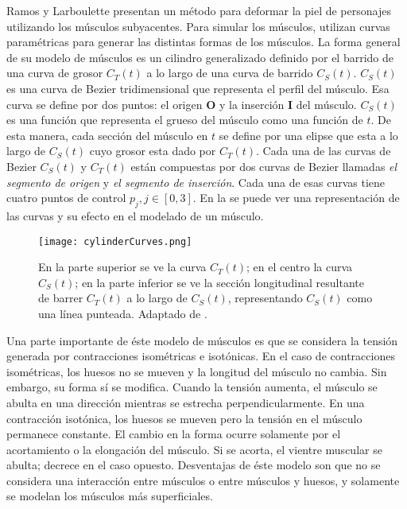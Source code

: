 Ramos y Larboulette \citep{ramos2013muscle} presentan un método para deformar la piel de personajes utilizando los músculos subyacentes. Para simular los músculos, utilizan curvas paramétricas para generar las distintas formas de los músculos. La forma general de su modelo de músculos es un cilindro generalizado definido por el barrido de una curva de grosor $C_T(t)$ a lo largo de una curva de barrido $C_S(t)$. $C_S(t)$ es una curva de Bezier tridimensional que representa el perfil del músculo. Esa curva se define por dos puntos: el origen \textbf{O} y la inserción \textbf{I} del músculo. $C_S(t)$ es una función que representa el grueso del músculo como una función de $t$. De esta manera, cada sección del músculo en $t$ se define por una elipse que esta a lo largo de $C_S(t)$ cuyo grosor esta dado por $C_T(t)$. Cada una de las curvas de Bezier $C_S(t)$ y $C_T(t)$ están compuestas por dos curvas de Bezier llamadas \textit{el segmento de origen} y \textit{el segmento de inserción}. Cada una de esas curvas tiene cuatro puntos de control $p_j, j \in [0,3]$. En la  se puede ver una representación de las curvas y su efecto en el modelado de un músculo.

\begin{figure}
	\centering
		\texttt{[image: cylinderCurves.png]}
		\caption[Deformación de un cilindro con curvas de Bezier.]{En la parte superior se ve la curva $C_T(t)$; en el centro la curva $C_S(t)$; en la parte inferior se ve la sección longitudinal resultante de barrer $C_T(t)$ a lo largo de $C_S(t)$, representando $C_S(t)$ como una línea punteada. Adaptado de \citep{ramos2013muscle}.}
		\label{fig:cylinderCurves}
\end{figure}

Una parte importante de éste modelo de músculos es que se considera la tensión generada por contracciones isométricas e isotónicas. En el caso de contracciones isométricas, los huesos no se mueven y la longitud del músculo no cambia. Sin embargo, su forma sí se modifica. Cuando la tensión aumenta, el músculo se abulta en una dirección mientras se estrecha perpendicularmente. En una contracción isotónica, los huesos se mueven pero la tensión en el músculo permanece constante. El cambio en la forma ocurre solamente por el acortamiento o la elongación del músculo. Si se acorta, el vientre muscular se abulta; decrece en el caso opuesto. Desventajas de éste modelo son que no se considera una interacción entre músculos o entre músculos y huesos, y solamente se modelan los músculos más superficiales. 

